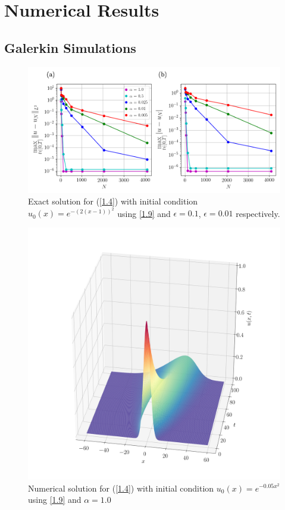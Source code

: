 \chapter{Numerical Results}
    \section{Galerkin Simulations}
    \begin{figure}
    	\includegraphics[width=\textwidth]{Figures/Galerkin/Graphics/alphas_Error_N.png}
    	\caption{Exact solution for (\ref{1.4}) with initial condition $u_0 (x) = e^{-(2(x - 1))^2}$ using \ref{1.9} and $\epsilon = 0.1$, $\epsilon = 0.01$ respectively.}
    	\label{Exact_Solution}
    \end{figure}
    \begin{figure}
    	\includegraphics[width=\textwidth]{Figures/Galerkin/Graphics/eps=1.0/Numerical_Solution_alpha=1.png}
    	\caption{Numerical solution for (\ref{1.4}) with initial condition $u_0 (x) = e^{- 0.05 x^2}$ using \ref{1.9} and $\alpha = 1.0$}
    	\label{Exact_Solution1}
    \end{figure}

